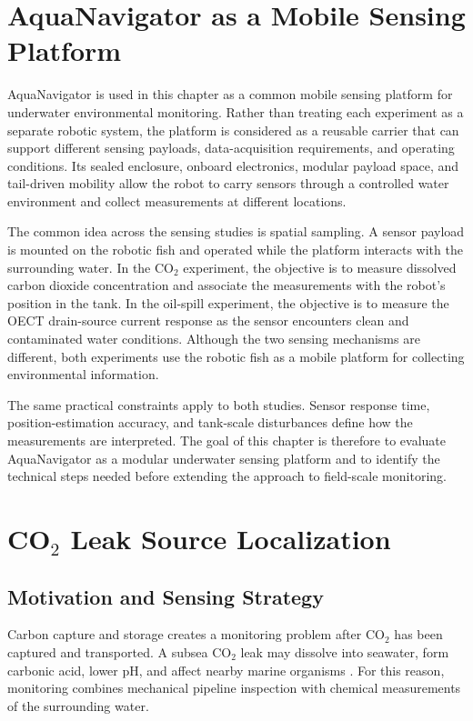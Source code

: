 \documentclass{uhcoethesis}
\begin{document}
\section{AquaNavigator as a Mobile Sensing Platform}

AquaNavigator is used in this chapter as a common mobile sensing platform for underwater environmental monitoring. Rather than treating each experiment as a separate robotic system, the platform is considered as a reusable carrier that can support different sensing payloads, data-acquisition requirements, and operating conditions. Its sealed enclosure, onboard electronics, modular payload space, and tail-driven mobility allow the robot to carry sensors through a controlled water environment and collect measurements at different locations.

The common idea across the sensing studies is spatial sampling. A sensor payload is mounted on the robotic fish and operated while the platform interacts with the surrounding water. In the \mbox{CO$_2$} experiment, the objective is to measure dissolved carbon dioxide concentration and associate the measurements with the robot's position in the tank. In the oil-spill experiment, the objective is to measure the OECT drain-source current response as the sensor encounters clean and contaminated water conditions. Although the two sensing mechanisms are different, both experiments use the robotic fish as a mobile platform for collecting environmental information.

The same practical constraints apply to both studies. Sensor response time, position-estimation accuracy, and tank-scale disturbances define how the measurements are interpreted. The goal of this chapter is therefore to evaluate AquaNavigator as a modular underwater sensing platform and to identify the technical steps needed before extending the approach to field-scale monitoring.

\section[CO2 Leak Source Localization]{CO$_2$ Leak Source Localization}

\subsection{Motivation and Sensing Strategy}

Carbon capture and storage creates a monitoring problem after \mbox{CO$_2$} has been captured and transported. A subsea \mbox{CO$_2$} leak may dissolve into seawater, form carbonic acid, lower pH, and affect nearby marine organisms \cite{Herzog2001,Filonchyk2024,Kabir2023,Zheng2021,Pham2016}. For this reason, monitoring combines mechanical pipeline inspection with chemical measurements of the surrounding water.
\end{document}
